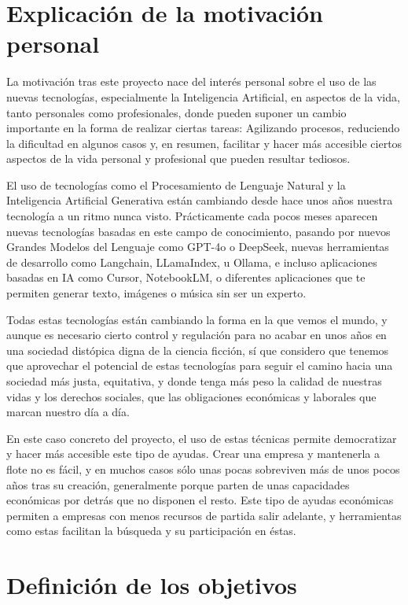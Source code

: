 \section{Explicación de la motivación personal}

La motivación tras este proyecto nace del interés personal sobre el uso de las nuevas tecnologías, especialmente la Inteligencia Artificial, en aspectos de la vida, tanto personales como profesionales, donde pueden suponer un cambio importante en la forma de realizar ciertas tareas: Agilizando procesos, reduciendo la dificultad en algunos casos y, en resumen, facilitar y hacer más accesible ciertos aspectos de la vida personal y profesional que pueden resultar tediosos.

El uso de tecnologías como el Procesamiento de Lenguaje Natural y la Inteligencia Artificial Generativa están cambiando desde hace unos años nuestra tecnología a un ritmo nunca visto. Prácticamente cada pocos meses aparecen nuevas tecnologías basadas en este campo de conocimiento, pasando por nuevos Grandes Modelos del Lenguaje como GPT-4o o DeepSeek, nuevas herramientas de desarrollo como Langchain, LLamaIndex, u Ollama, e incluso aplicaciones basadas en IA como Cursor, NotebookLM, o diferentes aplicaciones que te permiten generar texto, imágenes o música sin ser un experto.

Todas estas tecnologías están cambiando la forma en la que vemos el mundo, y aunque es necesario cierto control y regulación para no acabar en unos años en una sociedad distópica digna de la ciencia ficción, sí que considero que tenemos que aprovechar el potencial de estas tecnologías para seguir el camino hacia una sociedad más justa, equitativa, y donde tenga más peso la calidad de nuestras vidas y los derechos sociales, que las obligaciones económicas y laborales que marcan nuestro día a día.

En este caso concreto del proyecto, el uso de estas técnicas permite democratizar y hacer más accesible este tipo de ayudas. Crear una empresa y mantenerla a flote no es fácil, y en muchos casos sólo unas pocas sobreviven más de unos pocos años tras su creación, generalmente porque parten de unas capacidades económicas por detrás que no disponen el resto. Este tipo de ayudas económicas permiten a empresas con menos recursos de partida salir adelante, y herramientas como estas facilitan la búsqueda y su participación en éstas.

\newpage

\section{Definición de los objetivos}

